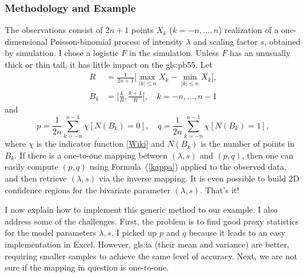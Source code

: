 \documentclass[10pt]{article}
\begin{document}
\subsubsection{Methodology and Example}\label{cils1}

The observations consist of $2n+1$ points $X_k$ ($k=-n,\dots,n$) realization of a one-dimensional Poisson-binomial process of intensity $\lambda$ and scaling factor $s$, obtained by simulation.  I chose a logistic $F$ in the simulation. Unless $F$ has an unusually thick or thin tail, it has little impact on the \gls{gls:pb55}. Let
\begin{align} 
R & =\frac{1}{2n+1}\Big[\max_{|k|\leq n} X_k-\min_{|k|\leq n} X_k\Big], \label{bk00} \\
B_k  & = \Big[\frac{k}{R}, \frac{k+1}{R}\Big[, \quad k=-n,\dots,n-1 \label{bk01} 
\end{align}
and
\begin{equation}
p  =\frac{1}{2n} \sum_{k=-n}^{n-1} \chi[N(B_k)=0], \quad
q  =\frac{1}{2n} \sum_{k=-n}^{n-1} \chi[N(B_k)=1],
 \label{kappa}
\end{equation}
where $\chi$ is the indicator function 
[\href{https://en.wikipedia.org/wiki/Indicator_function}{Wiki}] and $N(B_k)$ is the number of points in $B_k$. If there is a one-to-one mapping between $(\lambda,s)$ and $(p,q)$, then one can easily compute $(p,q)$ using Formula~(\ref{kappa}) applied to the observed data, and then retrieve $(\lambda,s)$ via the inverse mapping. It is even possible to build 2D confidence regions for the bivariate parameter $(\lambda, s)$. That's it! 

I now explain how to implement this generic method to our example. I also address some of the challenges. First, the problem is to find good proxy statistics for 
the model parameters $\lambda,s$. I picked up $p$ and $q$ because it leads to an easy implementation in Excel. However, 
\gls{gls:ia} (their mean and variance) 
are better, requiring smaller samples to achieve the same level of accuracy. Next, we are not sure if the mapping in question is one-to-one. 
\end{document}
